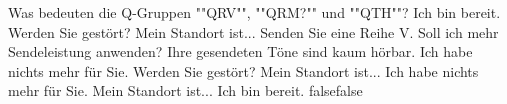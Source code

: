    {Was bedeuten die Q-Gruppen ""QRV"", ""QRM?"" und ""QTH""?}
    {Ich bin bereit. Werden Sie gestört? Mein Standort ist...}
    {Senden Sie eine Reihe V. Soll ich mehr Sendeleistung anwenden? Ihre gesendeten Töne sind kaum hörbar.}
    {Ich habe nichts mehr für Sie. Werden Sie gestört? Mein Standort ist...}
    {Ich habe nichts mehr für Sie. Mein Standort ist... Ich bin bereit.}
    {false}{false}